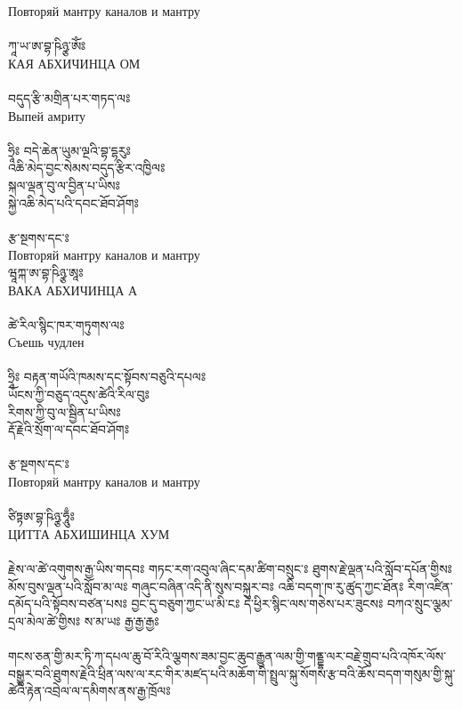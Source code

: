 Повторяй мантру каналов и мантру\\
\\
{\ti ཀཱ་ཡ་ཨ་བྷ་ཥིཉྩ་ཨོཾཿ }\\
КАЯ АБХИЧИНЦА ОМ\\
\\
{\ti བདུད་རྩི་མགྲིན་པར་གཏད་ལཿ }\\
Выпей амриту\\
\\
{\ti ཧྲཱིཿ བདེ་ཆེན་ཡུམ་ལྔའི་བྷ་དྷརུཿ \\
འཆི་མེད་བྱང་སེམས་བདུད་རྩིར་འཁྱིལཿ \\
སྐལ་ལྡན་བུ་ལ་བྱིན་པ་ཡིསཿ \\
སྐྱེ་འཆི་མེད་པའི་དབང་ཐོབ་ཤོགཿ \\
\\
རྩ་སྔགས་དང་ཿ }\\
Повторяй мантру каналов и мантру\\

{\ti ཝཱཀྐ་ཨ་བྷ་ཥིཉྩ་ཨཱཿ }\\
ВАКА АБХИЧИНЦА А\\
\\
{\ti ཚེ་རིལ་སྙིང་ཁར་གཏུགས་ལཿ }\\
Съешь чудлен\\
\\
{\ti ཧྲཱིཿ བརྟན་གཡོའི་ཁམས་དང་སྟོབས་བཅུའི་དཔལཿ \\
ཡོངས་ཀྱི་བཅུད་འདུས་ཚེའི་རིལ་བུཿ \\
རིགས་ཀྱི་བུ་ལ་སྦྱིན་པ་ཡིསཿ \\
རྡོ་རྗེའི་སྲོག་ལ་དབང་ཐོབ་ཤོགཿ \\
\\
རྩ་སྔགས་དང་ཿ }\\
Повторяй мантру каналов и мантру\\
\\
{\ti ཙིཏྟཨ་བྷ་ཥིཉྩ་ཧཱུྃཿ }\\
ЦИТТА АБХИШИНЦА ХУМ\\
\\
{\ti རྗེས་ལ་ཚེ་འགུགས་རྒྱ་ཡིས་གདབཿ གཏང་རག་འབུལ་ཞིང་དམ་ཚིག་བསྲུང་ཿ ཐུགས་རྗེ་ལྡན་པའི་སློབ་དཔོན་གྱིསཿ མོས་བུས་ལྡན་པའི་སློབ་མ་ལཿ གཞུང་བཞིན་འདི་ནི་སུས་བསྐུར་བཿ འཆི་བདག་ཁ་རུ་ཚུད་ཀྱང་ཐོནཿ རིག་འཛིན་དམོད་པའི་སྟོབས་བཙན་པསཿ བྱང་དུ་བཅུག་ཀྱང་ཡ་མི་ངཿ དེ་ཕྱིར་སྙིང་ལས་གཅེས་པར་ཟུངསཿ བཀའ་སྲུང་ལྕམ་དྲལ་མེལ་ཚེ་གྱིསཿ ས་མ་ཡཿ རྒྱ་རྒྱ་རྒྱཿ \\
\\
གངས་ཅན་གྱི་མར་ཏི་ཀ་དཔལ་ཆུ་བོ་རིའི་ལྕགས་ཟམ་བྱང་ཆུབ་རྒྱུན་ལམ་གྱི་གནྡྷ་ལར་བརྗེ་གྲུབ་པའི་འཁོར་ལོས་བསྒྱུར་བའི་ཐུགས་རྗེའི་ཕྲིན་ལས་ལ་རང་གིར་མཛད་པའི་མཆོག་གི་སྤྲུལ་སྐུ་སོགས་རྩ་བའི་ཆོས་བདག་གསུམ་གྱི་སྐུ་ཚེའི་རྟེན་འབྲེལ་ལ་དམིགས་ནས་རྒྱ་ཁྲོལཿ}\\


